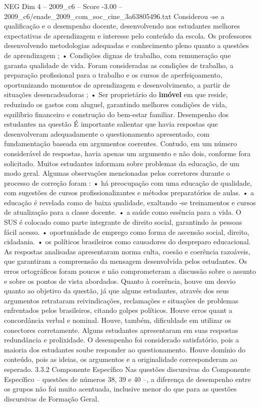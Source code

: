 \begin{textsample}{NEG Dim 4 – 2009\_c6 – Score -3.00 – 2009\_c6/enade\_2009\_com\_soc\_cine\_3a63805496.txt}
Considerou -se a qualificação e o desempenho docente, desenvolvendo nos estudantes melhores expectativas de aprendizagem e interesse pelo conteúdo da escola.
Os professores desenvolvendo metodologias adequadas e conhecimento pleno quanto a questões de aprendizagem ; • Condições dignas de trabalho, com remuneração que garanta qualidade de vida.
Foram consideradas as condições de trabalho, a preparação profissional para o trabalho e os cursos de aperfeiçoamento, oportunizando momentos de aprendizagem e desenvolvimento, a partir de situações desencadeadoras ; • Ser proprietário do \textbf{imóvel} em que reside, reduzindo os gastos com aluguel, garantindo melhores condições de vida, equilíbrio financeiro e construção do bem-estar familiar.
Desempenho dos estudantes na questão É importante salientar que havia respostas que desenvolveram adequadamente o questionamento apresentado, com fundamentação baseada em argumentos coerentes.
Contudo, em um número considerável de respostas, havia apenas um argumento e não dois, conforme fora solicitado.
Muitos estudantes informam sobre problemas da educação, de um modo geral.
Algumas observações mencionadas pelos corretores durante o processo de correção foram : • há preocupação com uma educação de qualidade, com sugestões de cursos profissionalizantes e métodos preparatórios de aulas. • a educação é revelada como de baixa qualidade, exaltando -se treinamentos e cursos de atualização para a classe docente. • a saúde como essência para a vida.
O SUS é colocado como parte integrante de direito social, garantindo às pessoas fácil acesso. • oportunidade de emprego como forma de ascensão social, direito, cidadania. • os políticos brasileiros como causadores do despreparo educacional.
As respostas analisadas apresentaram norma culta, coesão e coerência razoáveis, que garantiram a compreensão da mensagem desenvolvida pelos estudantes.
Os erros ortográficos foram poucos e não comprometeram a discussão sobre o assunto e sobre os pontos de vista abordados.
Quanto à coerência, houve um desvio quanto ao objetivo da questão, já que alguns estudantes, através dos seus argumentos retrataram reivindicações, reclamações e situações de problemas enfrentados pelos brasileiros, citando golpes políticos.
Houve erros quant a concordância verbal e nominal.
Houve, também, dificuldade em utilizar os conectores corretamente.
Alguns estudantes apresentaram em suas respostas redundância e prolixidade.
O desempenho foi considerado satisfatório, pois a maioria dos estudantes soube responder ao questionamento.
Houve domínio do conteúdo, pois as ideias, os argumentos e a originalidade corresponderam ao esperado. 3.3.2 Componente Específico Nas questões discursivas do Componente Específico – questões de números 38, 39 e 40 –, a diferença de desempenho entre os grupos não foi muito acentuada, inclusive menor do que para as questões discursivas de Formação Geral.

\end{textsample}

